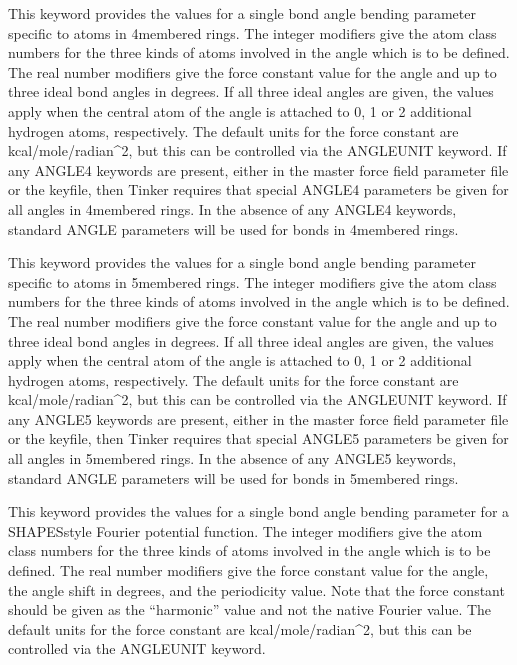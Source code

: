 \documentclass[letterpaper,11pt,english]{sphinxmanual}
\begin{document}
  This keyword provides the values for a single bond angle bending parameter specific to atoms in 4\sphinxhyphen{}membered rings. The integer modifiers give the atom class numbers for the three kinds of atoms involved in the angle which is to be defined. The real number modifiers give the force constant value for the angle and up to three ideal bond angles in degrees. If all three ideal angles are given, the values apply when the central atom of the angle is attached to 0, 1 or 2 additional hydrogen atoms, respectively. The default units for the force constant are kcal/mole/radian\textasciicircum{}2, but this can be controlled via the ANGLEUNIT keyword. If any ANGLE4 keywords are present, either in the master force field parameter file or the keyfile, then Tinker requires that special ANGLE4 parameters be given for all angles in 4\sphinxhyphen{}membered rings. In the absence of any ANGLE4 keywords, standard ANGLE parameters will be used for bonds in 4\sphinxhyphen{}membered rings.

  This keyword provides the values for a single bond angle bending parameter specific to atoms in 5\sphinxhyphen{}membered rings. The integer modifiers give the atom class numbers for the three kinds of atoms involved in the angle which is to be defined. The real number modifiers give the force constant value for the angle and up to three ideal bond angles in degrees. If all three ideal angles are given, the values apply when the central atom of the angle is attached to 0, 1 or 2 additional hydrogen atoms, respectively. The default units for the force constant are kcal/mole/radian\textasciicircum{}2, but this can be controlled via the ANGLEUNIT keyword. If any ANGLE5 keywords are present, either in the master force field parameter file or the keyfile, then Tinker requires that special ANGLE5 parameters be given for all angles in 5\sphinxhyphen{}membered rings. In the absence of any ANGLE5 keywords, standard ANGLE parameters will be used for bonds in 5\sphinxhyphen{}membered rings.

  This keyword provides the values for a single bond angle bending parameter for a SHAPES\sphinxhyphen{}style Fourier potential function. The integer modifiers give the atom class numbers for the three kinds of atoms involved in the angle which is to be defined. The real number modifiers give the force constant value for the angle, the angle shift in degrees, and the periodicity value. Note that the force constant should be given as the “harmonic” value and not the native Fourier value. The default units for the force constant are kcal/mole/radian\textasciicircum{}2, but this can be controlled via the ANGLEUNIT keyword.
\end{document}
